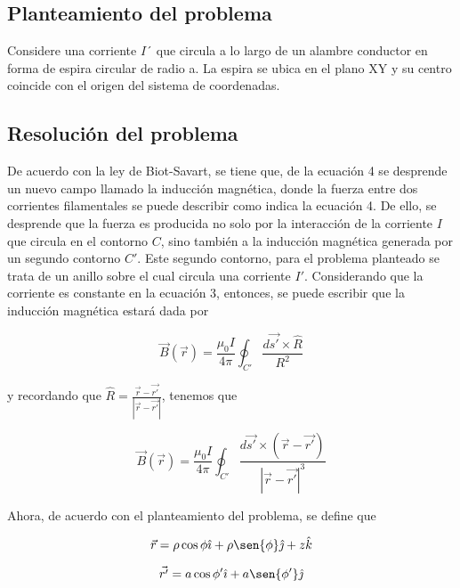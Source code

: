 \begin{multicols}{2}
\section{Planteamiento del problema}
Considere una corriente $I´$ que circula a lo largo de un alambre conductor en forma de espira circular de radio a. La espira se ubica en el plano XY y su centro coincide con el origen del sistema de coordenadas. 

\subsection{Resolución del problema}
De acuerdo con la ley de Biot-Savart, se tiene que, de la ecuación 4 se desprende un nuevo campo llamado la inducción magnética, donde la fuerza entre dos corrientes filamentales se puede describir como indica la ecuación 4. De ello, se desprende que la fuerza es producida no solo por la interacción de la corriente $I$ que circula en el contorno $C$, sino también a la inducción magnética generada por un segundo contorno $C'$. Este segundo contorno, para el problema planteado se trata de un anillo sobre el cual circula una corriente $I'$. Considerando que la corriente es constante en la ecuación 3, entonces, se puede escribir que la inducción magnética estará dada por

\begin{equation}
    \vec{B}\left(\vec{r}\right) = \frac{\mu_0 I}{4\pi} \oint_{C'} \frac{d\vec{s'} \times \hat{R}}{R^2}
\end{equation}

y recordando que $\hat{R} = \frac{\vec{r} - \vec{r'}}{|\vec{r} - \vec{r'}|}$, tenemos que

\begin{equation}
    \vec{B}\left(\vec{r}\right) = \frac{\mu_0 I}{4\pi} \oint_{C'} \frac{d\vec{s'} \times (\vec{r} - \vec{r'})}{|\vec{r} - \vec{r'}|^3}
\end{equation}

Ahora, de acuerdo con el planteamiento del problema, se define que

\begin{equation}
    \vec{r} = \rho\cos{\phi}\hat{\imath} + \rho\sen{\phi}\hat{\jmath} + z\hat{k} \\
\end{equation}

\begin{equation}
    \vec{r'} = a\cos{\phi'}\hat{\imath} + a\sen{\phi'}\hat{\jmath}
\end{equation}


\end{multicols}
